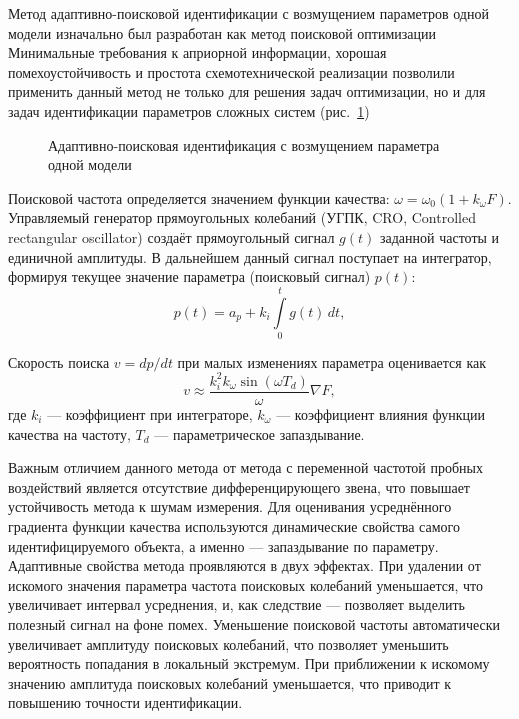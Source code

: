 Метод адаптивно-поисковой идентификации с возмущением параметров одной модели
изначально был разработан как метод поисковой оптимизации
\cite{mich_92}
Минимальные требования к априорной информации, хорошая помехоустойчивость и
простота схемотехнической реализации позволили применить данный метод не только
для решения задач оптимизации, но и для задач идентификации параметров сложных
систем
(рис.~\ref{atu:f:apid1})

\begin{figure}[htb!]
\begin{center}

\end{center}
\caption{Адаптивно-поисковая идентификация с возмущением параметра одной модели}
\label{atu:f:apid1}
\end{figure}

Поисковой частота определяется
значением функции качества:
\( \omega = \omega_0 ( 1 + k_\omega F ) \).
Управляемый генератор прямоугольных колебаний (УГПК, CRO, Controlled rectangular oscillator)
создаёт прямоугольный сигнал \( g(t) \)
заданной частоты и единичной амплитуды.
В дальнейшем данный сигнал поступает на интегратор,
формируя текущее значение параметра (поисковый сигнал) \( p(t) \):
%
\begin{equation}
 p(t) = a_p + k_i \int\limits_{0}^{t} g(t) \, dt ,
\label{atu:eq:api_integr}
\end{equation}

Скорость поиска $v = dp / dt$ при малых изменениях параметра
оценивается как
%
\begin{equation}
\label{atu:eq:vasi}
  v
  \approx
  \frac{k_i^2 k_\omega \sin(\omega T_d) }{\omega} \nabla {F},
\end{equation}
%
где
$k_i$ --- коэффициент при интеграторе,
$k_\omega$ --- коэффициент влияния функции качества на частоту,
$T_d$ --- параметрическое запаздывание.

Важным отличием данного метода от метода с переменной частотой пробных воздействий является
отсутствие дифференцирующего звена, что повышает устойчивость метода к шумам измерения.
Для оценивания усреднённого градиента функции качества используются
динамические свойства самого идентифицируемого объекта, а именно --- запаздывание
по параметру. Адаптивные свойства метода
проявляются в двух эффектах.
При удалении от искомого значения параметра частота поисковых колебаний
уменьшается, что увеличивает интервал усреднения, и, как следствие ---
позволяет выделить полезный сигнал на фоне помех.
Уменьшение поисковой частоты автоматически увеличивает амплитуду поисковых колебаний,
что позволяет уменьшить вероятность попадания в локальный экстремум.
При приближении к искомому значению амплитуда поисковых колебаний уменьшается,
что приводит к повышению точности идентификации.

